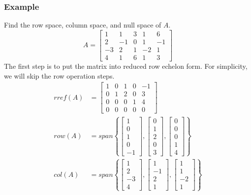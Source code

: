 \documentclass{math}
\begin{document}
\subsubsection*{Example}
Find the row space, column space, and null space of \( A \).
\[ A = \begin{bmatrix}
  1 & 1 & 3 & 1 & 6 \\
  2 & -1 & 0 & 1 & -1 \\
  -3 & 2 & 1 & -2 & 1 \\
  4 & 1 & 6 & 1 & 3
\end{bmatrix} \]
The first step is to put the matrix into reduced row echelon form. For
simplicity, we will skip the row operation steps.
\begin{align*}
  rref(A) &= \begin{bmatrix}
    1 & 0 & 1 & 0 & -1 \\
    0 & 1 & 2 & 0 & 3 \\
    0 & 0 & 0 & 1 & 4 \\
    0 & 0 & 0 & 0 & 0
  \end{bmatrix} \\
  row(A) &= span\left\{
    \begin{bmatrix}1 \\ 0 \\ 1 \\ 0 \\ -1\end{bmatrix},
    \begin{bmatrix}0 \\ 1 \\ 2 \\ 0 \\ 3\end{bmatrix},
    \begin{bmatrix}0 \\ 0 \\ 0 \\ 1 \\ 4\end{bmatrix}
  \right\} \\
  col(A) &= span\left\{
    \begin{bmatrix}1 \\ 2 \\ -3 \\ 4\end{bmatrix},
    \begin{bmatrix}1 \\ -1 \\ 2 \\ 1\end{bmatrix},
    \begin{bmatrix}1 \\ 1 \\ -2 \\ 1\end{bmatrix}
  \right\}
\end{align*}
\end{document}
